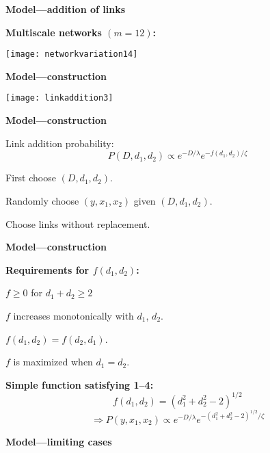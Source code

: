   \textbf{Model---addition of links}

  \textbf{Multiscale networks $(m=12)$:}
    \begin{center}
      \texttt{[image: networkvariation14]}
    \end{center}
  



  \textbf{Model---construction}

  \begin{center}
    \texttt{[image: linkaddition3]}
  \end{center}


  \textbf{Model---construction}

  
    
     
      Link addition probability:
      $$
      P(D,d_1,d_2) 
      \propto 
      e^{-D/\lambda} e^{-f(d_1,d_2)/\zeta}
      $$
     
      First choose $(D,d_1,d_2)$.
     
      Randomly choose $(y,x_1,x_2)$ given $(D,d_1,d_2)$.
     
      Choose links without replacement.
    
  


  \textbf{Model---construction}

  \textbf{Requirements for $f(d_1,d_2)$:}
    
     
      $f \geq 0$ for $d_1+d_2 \geq 2$
    
      $f$ increases monotonically with $d_1$, $d_2$.
    
      $f(d_1,d_2) = f(d_2,d_1)$.
    
      $f$ is maximized when $d_1=d_2$.
    
  

  \textbf{Simple function satisfying 1--4:}
    $$
    f(d_1,d_2) = (d_1^2 + d_2^2-2)^{1/2}
    $$
    $$
    \Rightarrow
    P(y,x_1,x_2) \propto e^{-D/\lambda} e^{-(d_1^2 + d_2^2-2)^{1/2}/\zeta} 
    $$  
  


  \textbf{Model---limiting cases}

